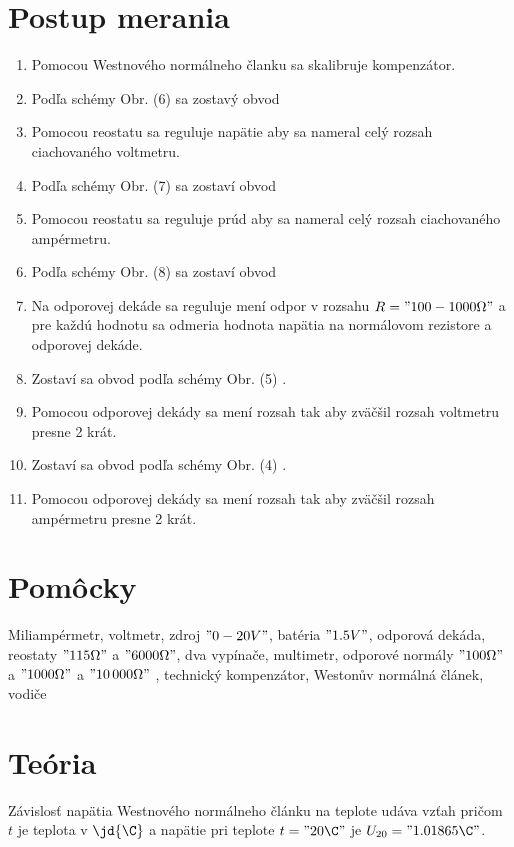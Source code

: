 \documentclass[a4paper,10pt]{article}
\begin{document}
\section{Postup merania}
\begin{enumerate}
\item Pomocou Westnového normálneho članku sa skalibruje kompenzátor.
\item Podľa schémy Obr. (6) \cite{C_1} sa zostavý obvod
\item Pomocou reostatu sa reguluje napätie aby sa nameral celý rozsah ciachovaného voltmetru.
\item Podľa schémy Obr. (7) \cite{C_1} sa zostaví obvod
\item Pomocou reostatu sa reguluje prúd aby sa nameral celý rozsah ciachovaného ampérmetru.
\item Podľa schémy Obr. (8) \cite{C_1} sa zostaví obvod
\item Na odporovej dekáde sa reguluje mení odpor v rozsahu $R = "100-1000 \Omega"$ a pre každú hodnotu sa odmeria hodnota napätia na normálovom rezistore a odporovej dekáde.
\item Zostaví sa obvod podľa schémy Obr. (5) \cite{C_1}.
\item Pomocou odporovej dekády sa mení rozsah tak aby zväčšil rozsah voltmetru presne 2 krát.
\item Zostaví sa obvod podľa schémy Obr. (4) \cite{C_1}.
\item Pomocou odporovej dekády sa mení rozsah tak aby zväčšil rozsah ampérmetru presne 2 krát.
\end{enumerate}

\section{Pomôcky}
Miliampérmetr, voltmetr, zdroj $"0-20 V"$, batéria $"1.5 V"$, odporová dekáda, reostaty $"115 \Omega"$ a $"6000 \Omega"$, 
dva vypínače, multimetr, odporové normály $"100 \Omega"$ a $"1000 \Omega"$ a $"10\,000 \Omega"$ , technický kompenzátor, 
Westonův normálná článek, vodiče

\section{Teória}
Závislosť napätia Westnového normálneho článku na teplote udáva vzťah
pričom $t$ je teplota v $\jd{\C}$ a napätie pri teplote $t = "20 \C"$ je $U_{20} = "1.01865 \C"$.
\end{document}
